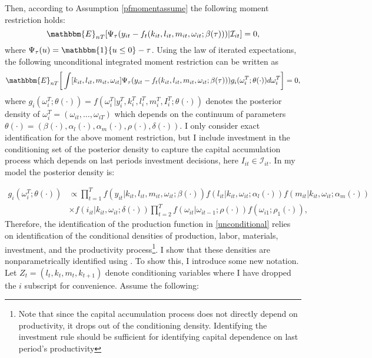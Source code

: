 \documentclass{article}
\begin{document}
Then, according to Assumption \ref{pfmomentassume} the following moment restriction holds:
\begin{equation}
\mathbbm{E}_{nT}[\Psi_{\tau}(y_{it}-f_{t}(k_{it}, l_{it}, m_{it}, \omega_{it}; \beta(\tau)))|\mathcal{I}_{it}]=0,
\end{equation}
where $\Psi_{\tau}(u)=\mathbbm{1}\{u\leq0\}-\tau$. Using the law of iterated expectations, the following unconditional integrated moment restriction can be written as
\begin{equation} \label{unconditional}
\mathbbm{E}_{nT}\bigg[\int[k_{it}, l_{it}, m_{it}, \omega_{it}]\Psi_{\tau}(y_{it}-f_{t}(k_{it}, l_{it}, m_{it}, \omega_{it}; \beta(\tau)))g_{i}(\omega^{T}_{i};\theta(\cdot))d\omega^{T}_{i}\bigg]=0,
\end{equation}
where $g_{i}(\omega^{T}_{i};\theta(\cdot))=f(\omega^{T}_{i}|y^{T}_{i}, k^{T}_{i}, l^{T}_{i}, m^{T}_{i}, I^{T}_{i};\theta(\cdot))$ denotes the posterior density of $\omega^{T}_{i}=(\omega_{it},\dots,\omega_{iT})$ which depends on the continuum of parameters $\theta(\cdot)=(\beta(\cdot), \alpha_{l}(\cdot), \alpha_{m}(\cdot), \rho(\cdot), \delta(\cdot))$. I only consider exact identification for the above moment restriction, but I include investment in the conditioning set of the posterior density to capture the capital accumulation process which depends on last periods investment decisions, here $I_{it}\in\mathcal{I}_{it}$. In my model the posterior density is:

\begin{equation}\label{posterior}
\begin{split}
g_{i}(\omega^{T}_{i};\theta(\cdot))& \propto\prod_{t=1}^{T}f(y_{it}|k_{it}, l_{it}, m_{it}, \omega_{it};\beta(\cdot))f(l_{it}|k_{it}, \omega_{it};\alpha_{l}(\cdot))f(m_{it}|k_{it}, \omega_{it};\alpha_{m}(\cdot)) \\
&\times f(i_{it}|k_{it}, \omega_{it};\delta(\cdot))\prod_{t=2}^{T}f(\omega_{it}|\omega_{it-1};\rho(\cdot))f(\omega_{i1};\rho_{1}(\cdot)),
\end{split}
\end{equation}
Therefore, the identification of the production function in \eqref{unconditional} relies on identification of the conditional densities of production, labor, materials, investment, and the productivity process\footnote{Note that since the capital accumulation process does not directly depend on productivity, it drops out of the conditioning density. Identifying the investment rule should be sufficient for identifying capital dependence on last period's productivity}. I show that these densities are nonparametrically identified using \cite{Hu2008}. To show this, I introduce some new notation. Let $Z_{t}=(l_{t}, k_{t}, m_{t}, k_{t+1})$ denote conditioning variables where I have dropped the $i$ subscript for convenience. Assume the following: 
\end{document}
